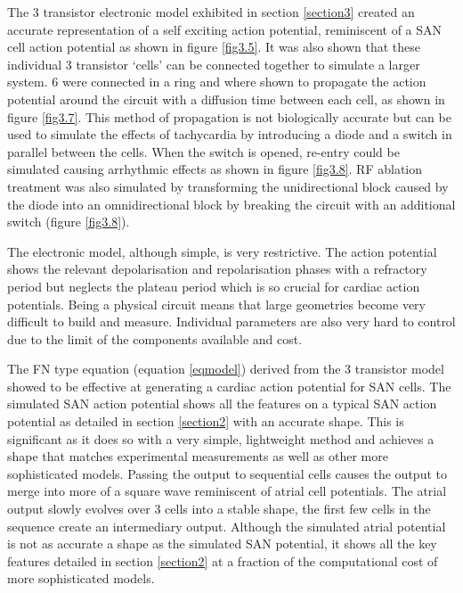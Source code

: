 The 3 transistor electronic model exhibited in section \ref{section3} created an accurate representation of a self exciting action potential, reminiscent of a SAN cell action potential as shown in figure \ref{fig3.5}. It was also shown that these individual 3 transistor `cells' can be connected together to simulate a larger system. 6 were connected in a ring and where shown to propagate the action potential around the circuit with a diffusion time between each cell, as shown in figure \ref{fig3.7}. This method of propagation is not biologically accurate but can be used to simulate the effects of tachycardia by introducing a diode and a switch in parallel between the cells. When the switch is opened, re-entry could be simulated causing arrhythmic effects as shown in figure \ref{fig3.8}. RF ablation treatment was also simulated by transforming the unidirectional block caused by the diode into an omnidirectional block by breaking the circuit with an additional switch (figure \ref{fig3.8}). \par
The electronic model, although simple, is very restrictive. The action potential shows the relevant depolarisation and repolarisation phases with a refractory period but neglects the plateau period which is so crucial for cardiac action potentials. Being a physical circuit means that large geometries become very difficult to build and measure. Individual parameters are also very hard to control due to the limit of the components available and cost. \par
The FN type equation (equation \ref{eqmodel}) derived from the 3 transistor model showed to be effective at generating a cardiac action potential for SAN cells. The simulated SAN action potential shows all the features on a typical SAN action potential as detailed in section \ref{section2} with an accurate shape. This is significant as it does so with a very simple, lightweight method and achieves a shape that matches experimental measurements as well as other more sophisticated models. Passing the output to sequential cells causes the output to merge into more of a square wave reminiscent of atrial cell potentials. The atrial output slowly evolves over 3 cells into a stable shape, the first few cells in the sequence create an intermediary output. Although the simulated atrial potential is not as accurate a shape as the simulated SAN potential, it shows all the key features detailed in section \ref{section2} at a fraction of the computational cost of more sophisticated models. \par 
